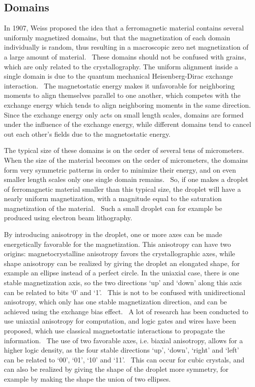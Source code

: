 \documentclass[11pt,a4paper,english]{article}
\begin{document}
\subsection{Domains}
In 1907, Weiss proposed the idea that a ferromagnetic material contains several uniformly magnetized domains, but that the magnetization of each domain individually is random, thus resulting in a macroscopic zero net magnetization of a large amount of material.~\cite{MuMax3_advances} These domains should not be confused with grains, which are only related to the crystallography. The uniform alignment inside a single domain is due to the quantum mechanical Heisenberg-Dirac exchange interaction.~\cite{MuMax3_advances, heisenberg1928theorie} The magnetostatic energy makes it unfavorable for neighboring moments to align themselves parallel to one another, which competes with the exchange energy which tends to align neighboring moments in the same direction. Since the exchange energy only acts on small length scales, domains are formed under the influence of the exchange energy, while different domains tend to cancel out each other's fields due to the magnetostatic energy. \par
The typical size of these domains is on the order of several tens of micrometers. When the size of the material becomes on the order of micrometers, the domains form very symmetric patterns in order to minimize their energy, and on even smaller length scales only one single domain remains.~\cite{NML_Carlton} So, if one makes a droplet of ferromagnetic material smaller than this typical size, the droplet will have a nearly uniform magnetization, with a magnitude equal to the saturation magnetization of the material.~\cite{NML_Carlton} Such a small droplet can for example be produced using electron beam lithography.~\cite{MQCA_RoomTemp, NML_Carlton} \par
By introducing anisotropy in the droplet, one or more axes can be made energetically favorable for the magnetization. This anisotropy can have two origins: magnetocrystalline anisotropy favors the crystallographic axes, while shape anisotropy can be realized by giving the droplet an elongated shape, for example an ellipse instead of a perfect circle. In the uniaxial case, there is one stable magnetization axis, so the two directions `up' and `down' along this axis can be related to bits `0' and `1'.~\cite{MQCA_RoomTemp} This is not to be confused with unidirectional anisotropy, which only has one stable magnetization direction, and can be achieved using the exchange bias effect.~\cite{ExchangeBias_Mechanisms,ExchangeBias_nanostructures,ExchangeBias} A lot of research has been conducted to use uniaxial anisotropy for computation, and logic gates and wires have been proposed, which use classical magnetostatic interactions to propagate the information.~\cite{GYP-18,MQCA_MajorityGate,SwitchingForced_EnergyEfficient} The use of two favorable axes, i.e. biaxial anisotropy, allows for a higher logic density, as the four stable directions `up', `down', `right' and `left' can be related to `00', `01', `10' and `11'.~\cite{MQCA_ImageRecognition} This can occur for cubic crystals, and can also be realized by giving the shape of the droplet more symmetry, for example by making the shape the union of two ellipses.
\end{document}
